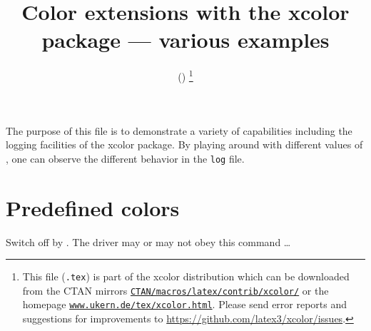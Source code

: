 \documentclass[a4paper]{article}
\begin{document}
\title{Color extensions with the \textsf{xcolor} package --- various examples}
\author{\href{mailto:xcolor@ukern.de}{}}
\date{\XCfileversion{} (\XCfiledate)
\thanks{This file (\texttt{\jobname.tex}) is part of the \textsf{xcolor} distribution which can be downloaded from the CTAN mirrors \texttt{\href{http://www.ctan.org/tex-archive/macros/latex/contrib/xcolor/}{CTAN/macros/latex/contrib/xcolor/}} or the homepage \texttt{\href{http://www.ukern.de/tex/xcolor.html}{www.ukern.de/tex/xcolor.html}}. Please send error reports and suggestions for improvements to \url{https://github.com/latex3/xcolor/issues}.}}
\maketitle

The purpose of this file is to demonstrate a variety of capabilities including the logging facilities of the \textsf{xcolor} package.
By playing around with different values of \texttt{\string\tracingcolors}, one can observe the different behavior in the \texttt{log} file.

\section{Predefined colors}

\begingroup
\small\sffamily
{}
\begin{testcolors}
\noalign{\medskip}\hline\noalign{\medskip}
\noalign{\medskip}\hline\noalign{\medskip}
\noalign{\medskip}\hline\noalign{\medskip}
\end{testcolors}
\endgroup

\vfill

\clearpage
\nopagecolor
Switch off \texttt{\string\pagecolor} by \texttt{\string\nopagecolor}.
The driver may or may not obey this command \dots
\end{document}
